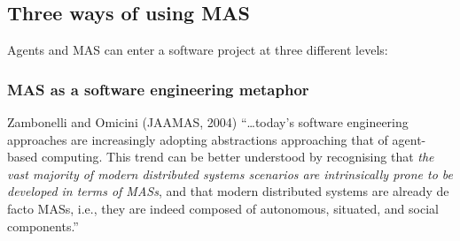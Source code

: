 \subsection{Three ways of using MAS}
\label{sec:uses-of-mas}

Agents and MAS can enter a software project at three different levels:

\begin{center}
\end{center}

\subsubsection{MAS as a software engineering metaphor}

\begin{nbfact}{Zambonelli and Omicini (JAAMAS, 2004)}
``\ldots today's software engineering approaches are increasingly adopting abstractions
approaching that of agent-based computing. This trend can be better understood by
recognising that \emph{the vast majority of modern distributed systems scenarios are
intrinsically prone to be developed in terms of MASs}, and that modern distributed systems
are already de facto MASs, i.e., they are indeed composed of autonomous, situated, and
social components.''
\end{nbfact}

